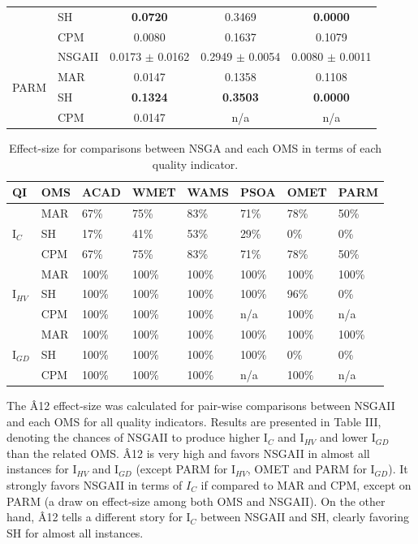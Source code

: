 \documentclass[conference]{IEEEtran}
\begin{document}
\begin{table}[htbp]
\begin{tabular}{p{0.7cm} p{0.7cm} ccc}
          & SH    & \textbf{0.0720} & 0.3469 & \textbf{0.0000} \\
          & CPM   & 0.0080 & 0.1637 & 0.1079 \\\hline
    \multirow{4}[2]{*}{PARM} & NSGAII & 0.0173 $\pm$ 0.0162 & 0.2949 $\pm$ 0.0054 & 0.0080 $\pm$ 0.0011 \\
          & MAR   & 0.0147 & 0.1358 & 0.1108 \\
          & SH    & \textbf{0.1324} & \textbf{0.3503} & \textbf{0.0000} \\
          & CPM   & 0.0147 & n/a   & n/a \\
    \bottomrule
    \end{tabular}%
\end{table}%

\begin{table}[htbp]
  \scriptsize
	\centering
  \caption{Effect-size for comparisons between NSGA and each OMS in terms of each quality indicator.}
    \begin{tabular}{p{0.6cm} p{0.6cm} p{0.65cm} p{0.65cm}p{0.65cm}p{0.65cm}p{0.65cm}p{0.65cm}}
    \toprule
    \textbf{QI} & \textbf{OMS} & \textbf{ACAD} & \textbf{WMET} & \textbf{WAMS} & \textbf{PSOA} & \textbf{OMET} & \textbf{PARM} \\
    \midrule
    \multirow{3}[1]{*}{I$_{C}$} & MAR   & 67\%  & 75\%  & 83\%  & 71\%  & 78\%  & 50\% \\
          & SH    & 17\%  & 41\%  & 53\%  & 29\%  & 0\%   & 0\% \\
          & CPM   & 67\%  & 75\%  & 83\%  & 71\%  & 78\%  & 50\% \\\hline
    \multirow{3}[2]{*}{I$_{HV}$} & MAR   & 100\% & 100\% & 100\% & 100\% & 100\% & 100\% \\
          & SH    & 100\% & 100\% & 100\% & 100\% & 96\%  & 0\% \\
          & CPM   & 100\% & 100\% & 100\% & n/a   & 100\% & n/a \\\hline
    \multirow{3}[2]{*}{I$_{GD}$} & MAR   & 100\% & 100\% & 100\% & 100\% & 100\% & 100\% \\
          & SH    & 100\% & 100\% & 100\% & 100\% & 0\%   & 0\% \\
          & CPM   & 100\% & 100\% & 100\% & n/a   & 100\% & n/a \\
    \bottomrule
    \end{tabular}%
\end{table}%

The {\^A12} effect-size was calculated for pair-wise comparisons between NSGAII and each OMS for all quality indicators. Results are presented in Table III, denoting the chances of NSGAII to produce higher I$_C$ and I$_{HV}$ and lower I$_{GD}$ than the related OMS. {\^A}12 is very high and favors NSGAII in almost all instances for I$_{HV}$ and I$_{GD}$ (except PARM for I$_{HV}$, OMET and PARM for I$_{GD}$). It strongly favors NSGAII in terms of $I_C$ if compared to MAR and CPM, except on PARM (a draw on effect-size among both OMS and NSGAII). On the other hand, {\^A}12 tells a different story for I$_{C}$ between NSGAII and SH, clearly favoring SH for almost all instances. 
\end{document}
